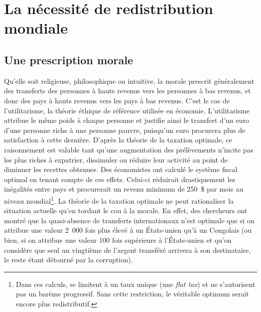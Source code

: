\documentclass[a5paper,french,openany]{memoir}
\begin{document}
\chapter{La nécessité de redistribution mondiale\label{ch:redistribution_necessaire}}

\section{Une prescription morale}
Qu'elle soit religieuse, philosophique ou intuitive, la morale prescrit généralement des transferts des personnes à hauts revenus vers les personnes à bas revenus, et donc des pays à hauts revenus vers les pays à bas revenus. C'est le cas de l'utilitarisme, la théorie éthique de référence utilisée en économie. L'utilitarisme attribue le même poids à chaque personne et justifie ainsi le transfert d'un euro d'une personne riche à une personne pauvre, puisqu'un euro procurera plus de satisfaction à cette dernière. D'après la théorie de la taxation optimale, ce raisonnement est valable tant qu'une augmentation des prélèvements n'incite pas les plus riches à expatrier, dissimuler ou réduire leur activité au point de diminuer les recettes obtenues. Des économistes ont calculé le système fiscal optimal en tenant compte de ces effets. Celui-ci réduirait drastiquement les inégalités entre pays et procurerait un revenu minimum de 250~\$ par mois au niveau mondial\footnote{Dans ces calculs, \citet{kopczuk_limitations_2005} se limitent à un taux unique (une \textit{flat tax}) et ne s'autorisent pas un barème progressif. Sans cette restriction, le véritable optimum serait encore plus redistributif.}. %
La théorie de la taxation optimale ne peut rationaliser la situation actuelle qu'en tordant le cou à la morale. En effet, des chercheurs ont montré que la quasi-absence de transferts internationaux n'est optimale que si on attribue une valeur 2~000 fois plus élevé à un États-unien qu'à un Congolais (ou bien, si on attribue une valeur 100 fois supérieure à l'États-unien et qu'on considère que seul un vingtième de l'argent transféré arrivera à son destinataire, le reste étant détourné par la corruption). %
\end{document}
